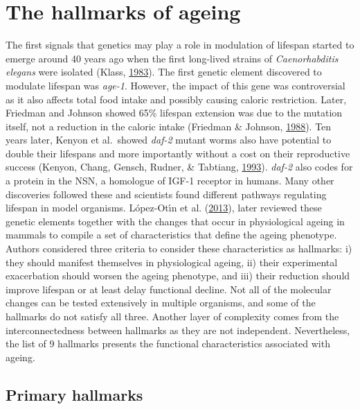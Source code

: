 \documentclass[12pt,twoside]{unicam}
\begin{document}
\hypertarget{introHallmarks}{%
\section{The hallmarks of ageing}\label{introHallmarks}}

The first signals that genetics may play a role in modulation of lifespan started to emerge around 40 years ago when the first long-lived strains of \emph{Caenorhabditis elegans} were isolated (Klass, \protect\hyperlink{ref-Klass1983}{1983}). The first genetic element discovered to modulate lifespan was \emph{age-1}. However, the impact of this gene was controversial as it also affects total food intake and possibly causing caloric restriction. Later, Friedman and Johnson showed 65\% lifespan extension was due to the mutation itself, not a reduction in the caloric intake (Friedman \& Johnson, \protect\hyperlink{ref-Friedman1988}{1988}). Ten years later, Kenyon et al.~showed \emph{daf-2} mutant worms also have potential to double their lifespans and more importantly without a cost on their reproductive success (Kenyon, Chang, Gensch, Rudner, \& Tabtiang, \protect\hyperlink{ref-Kenyon1993}{1993}). \emph{daf-2} also codes for a protein in the NSN, a homologue of IGF-1 receptor in humans. Many other discoveries followed these and scientists found different pathways regulating lifespan in model organisms. López-Otı́n et al. (\protect\hyperlink{ref-Lopez-Otin2013}{2013}), later reviewed these genetic elements together with the changes that occur in physiological ageing in mammals to compile a set of characteristics that define the ageing phenotype. Authors considered three criteria to consider these characteristics as hallmarks: i) they should manifest themselves in physiological ageing, ii) their experimental exacerbation should worsen the ageing phenotype, and iii) their reduction should improve lifespan or at least delay functional decline. Not all of the molecular changes can be tested extensively in multiple organisms, and some of the hallmarks do not satisfy all three. Another layer of complexity comes from the interconnectedness between hallmarks as they are not independent. Nevertheless, the list of 9 hallmarks presents the functional characteristics associated with ageing.

\hypertarget{introPrimaryHallmarks}{%
\subsection{Primary hallmarks}\label{introPrimaryHallmarks}}
\end{document}
